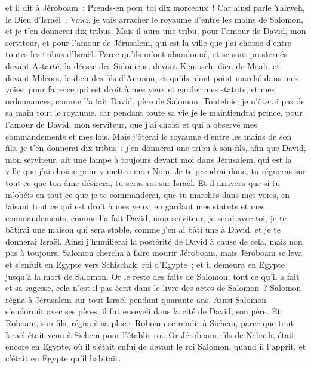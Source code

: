 \begin{multicols}{2}
et il dit à Jéroboam~: Prends-en pour toi dix morceaux~! Car ainsi parle Yahweh, le Dieu d'Israël~: Voici, je vais arracher le royaume d'entre les mains de Salomon, et je t'en donnerai dix tribus.
Mais il aura une tribu, pour l'amour de David, mon serviteur, et pour l'amour de Jérusalem, qui est la ville que j'ai choisie d'entre toutes les tribus d'Israël.
Parce qu'ils m'ont abandonné, et se sont prosternés devant Astarté, la déesse des Sidoniens, devant Kemosch, dieu de Moab, et devant Milcom, le dieu des fils d'Ammon, et qu'ils n'ont point marché dans mes voies, pour faire ce qui est droit à mes yeux et garder mes statuts, et mes ordonnances, comme l'a fait David, père de Salomon.
Toutefois, je n'ôterai pas de sa main tout le royaume, car pendant toute sa vie je le maintiendrai prince, pour l'amour de David, mon serviteur, que j'ai choisi et qui a observé mes commandements et mes lois.
Mais j'ôterai le royaume d'entre les mains de son fils, je t'en donnerai dix tribus~;
j'en donnerai une tribu à son fils, afin que David, mon serviteur, ait une lampe à toujours devant moi dans Jérusalem, qui est la ville que j'ai choisie pour y mettre mon Nom.
Je te prendrai donc, tu régneras sur tout ce que ton âme désirera, tu seras roi sur Israël.
Et il arrivera que si tu m'obéis en tout ce que je te commanderai, que tu marches dans mes voies, en faisant tout ce qui est droit à mes yeux, en gardant mes statuts et mes commandements, comme l'a fait David, mon serviteur, je serai avec toi, je te bâtirai une maison qui sera stable, comme j'en ai bâti une à David, et je te donnerai Israël.
Ainsi j'humilierai la postérité de David à cause de cela, mais non pas à toujours.
Salomon chercha à faire mourir Jéroboam, mais Jéroboam se leva et s'enfuit en Egypte vers Schischak, roi d'Egypte~; et il demeura en Egypte jusqu'à la mort de Salomon.
Or le reste des faits de Salomon, tout ce qu'il a fait et sa sagesse, cela n'est-il pas écrit dans le livre des actes de Salomon~?
Salomon régna à Jérusalem sur tout Israël pendant quarante ans.
Ainsi Salomon s'endormit avec ses pères, il fut enseveli dans la cité de David, son père. Et Roboam, son fils, régna à sa place.
\VerseOne{}Roboam se rendit à Sichem, parce que tout Israël était venu à Sichem pour l'établir roi.
Or Jéroboam, fils de Nebath, était encore en Egypte, où il s'était enfui de devant le roi Salomon, quand il l'apprit, et c'était en Egypte qu'il habitait.

\end{multicols}
